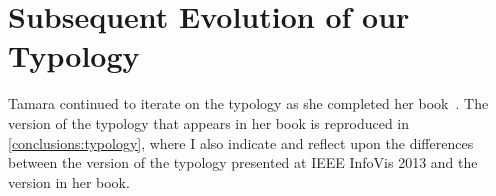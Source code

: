 

\section{Subsequent Evolution of our Typology}
\label{app:typology:chronology:evolution}


Tamara continued to iterate on the typology as she completed her book~\cite{Munzner2014}.
The version of the typology that appears in her book is reproduced in \autoref{conclusions:typology}, where I also indicate and reflect upon the differences between the version of the typology presented at IEEE InfoVis 2013 and the version in her book. 